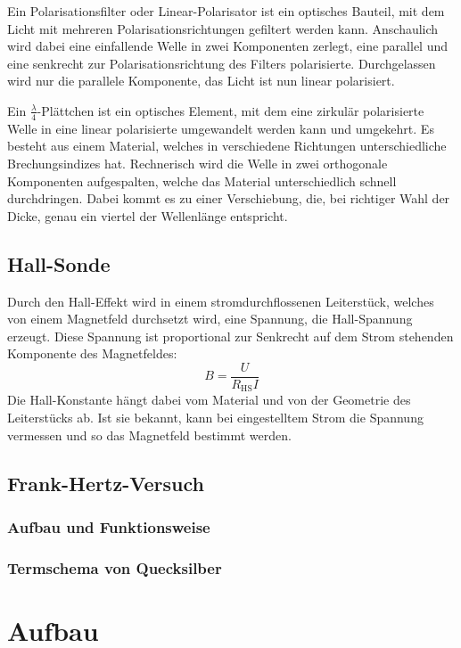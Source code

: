 Ein Polarisationsfilter oder Linear-Polarisator ist ein optisches Bauteil, mit
dem Licht mit mehreren Polarisationsrichtungen gefiltert werden kann.
Anschaulich wird dabei eine einfallende Welle in zwei Komponenten zerlegt, eine
parallel und eine senkrecht zur Polarisationsrichtung des Filters polarisierte.
Durchgelassen wird nur die parallele Komponente, das Licht ist nun linear
polarisiert.

Ein $\frac\lambda4$-Plättchen ist ein optisches Element, mit dem eine zirkulär
polarisierte Welle in eine linear polarisierte umgewandelt werden kann und
umgekehrt. Es besteht aus einem Material, welches in verschiedene Richtungen
unterschiedliche Brechungsindizes hat. Rechnerisch wird die Welle in zwei
orthogonale Komponenten aufgespalten, welche das Material unterschiedlich
schnell durchdringen. Dabei kommt es zu einer Verschiebung, die, bei richtiger
Wahl der Dicke, genau ein viertel der Wellenlänge entspricht.

\section{Hall-Sonde}

Durch den Hall-Effekt wird in einem stromdurchflossenen Leiterstück, welches
von einem Magnetfeld durchsetzt wird, eine Spannung, die Hall-Spannung erzeugt.
Diese Spannung ist proportional zur Senkrecht auf dem Strom stehenden
Komponente des Magnetfeldes:
\[
    B = \frac{U}{R_\text{HS}I}
\]
Die Hall-Konstante hängt dabei vom Material und von der Geometrie des
Leiterstücks ab. Ist sie bekannt, kann bei eingestelltem Strom die Spannung
vermessen und so das Magnetfeld bestimmt werden.

\section{Frank-Hertz-Versuch}

\subsection{Aufbau und Funktionsweise}

\subsection{Termschema von Quecksilber}

\chapter{Aufbau}

